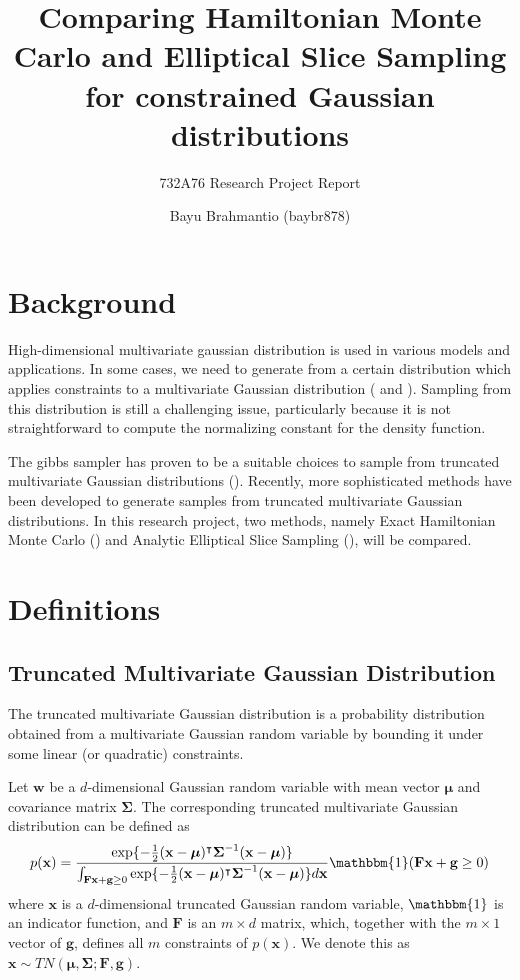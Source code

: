 \documentclass{scrartcl}
\title{Comparing Hamiltonian Monte Carlo and Elliptical Slice Sampling for constrained Gaussian distributions}
\subtitle{732A76 Research Project Report}
\author{Bayu Brahmantio (baybr878)}
\numberwithin{equation}{section}
\begin{document}
\maketitle

\section{Background}
High-dimensional multivariate gaussian distribution is used in various models and applications. In some cases, we need to generate from a certain distribution which applies constraints to a multivariate Gaussian distribution (\cite{gelfand1992GS} and \cite{RodrguezYam2004EfficientGS}). Sampling from this distribution is still a challenging issue, particularly because it is not straightforward to compute the normalizing constant for the density function.  

The gibbs sampler has proven to be a suitable choices to sample from truncated multivariate Gaussian distributions (\cite{gelfand1992GS}). Recently, more sophisticated methods have been developed to generate samples from truncated multivariate Gaussian distributions. In this research project, two methods, namely Exact Hamiltonian Monte Carlo (\cite{pakman2013exact}) and Analytic Elliptical Slice Sampling (\cite{Fagan2016ESSwEP}), will be compared. 


\section{Definitions}
\subsection{Truncated Multivariate Gaussian Distribution}
The truncated multivariate Gaussian distribution is a probability distribution obtained from a multivariate Gaussian random variable by bounding it under some linear (or quadratic) constraints.   

Let $\textbf{w}$ be a $d$-dimensional Gaussian random variable with mean vector $\boldsymbol{\mu}$ and covariance matrix $\boldsymbol{\Sigma}$. The corresponding truncated multivariate Gaussian distribution can be defined as
\begin{equation}\label{eq:tmg}
	p(\boldsymbol{\textbf{x}}) = \frac{\exp\{-\frac{1}{2}(\textbf{x}-\boldsymbol{\mu})^{\intercal} \boldsymbol{\Sigma}^{-1}(\textbf{x}-\boldsymbol{\mu})\}}{\int_{\textbf{F}\textbf{x} + \textbf{g} \geq 0} \exp\{-\frac{1}{2}(\textbf{x}-\boldsymbol{\mu})^{\intercal} \boldsymbol{\Sigma}^{-1}(\textbf{x}-\boldsymbol{\mu})\} d\textbf{x}}\mathbbm{1}(\textbf{F}\textbf{x} + \textbf{g} \geq 0)
\end{equation}
where $\textbf{x}$ is a $d$-dimensional truncated Gaussian random variable, $\mathbbm{1}$ is an indicator function, and $\textbf{F}$ is an $m \times d$ matrix, which, together with the $m \times 1$ vector of $\textbf{g}$, defines all $m$ constraints of $p(\boldsymbol{\textbf{x}})$.  We denote this as $\textbf{x} \sim TN(\boldsymbol{\mu}, \boldsymbol{\Sigma};\textbf{F},\textbf{g})$.   
\end{document}
